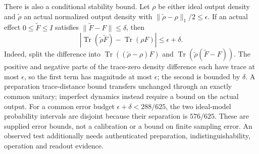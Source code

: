 There is also a conditional stability bound. Let $\rho$ be either ideal
output density and $\widetilde\rho$ an actual normalized output density
with $\|\widetilde\rho-\rho\|_1/2\leq\epsilon$. If an actual effect
$0\leq\widetilde F\leq I$ satisfies
$\|\widetilde F-F\|\leq\delta$, then
\[
 \left|\operatorname{Tr}(\widetilde\rho\widetilde F)
       -\operatorname{Tr}(\rho F)\right|
 \leq\epsilon+\delta.
\]
Indeed, split the difference into
$\operatorname{Tr}((\widetilde\rho-\rho)F)$ and
$\operatorname{Tr}(\widetilde\rho(\widetilde F-F))$.
The positive and negative parts of the trace-zero density difference
each have trace at most $\epsilon$, so the first term has magnitude at
most $\epsilon$; the second is bounded by $\delta$. A preparation
trace-distance bound transfers unchanged through an exactly common
unitary; imperfect dynamics instead require a bound on the actual output.
For a common error budget $\epsilon+\delta<288/625$, the two ideal-model
probability intervals are disjoint because their separation is $576/625$.
These are supplied error bounds, not a calibration or a bound on finite
sampling error. An observed test additionally needs authenticated
preparation, indistinguishability, operation and readout evidence.
